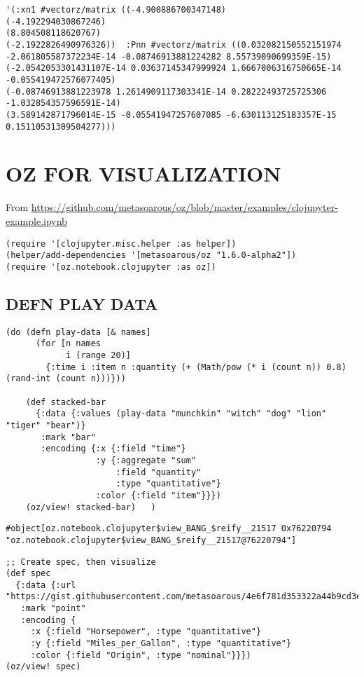 \documentclass[10pt,oneside,x11names]{article}
\begin{document}
\begin{verbatim}
'(:xn1 #vectorz/matrix ((-4.900886700347148)
(-4.192294030867246)
(8.804508118620767)
(-2.1922826490976326))  :Pnn #vectorz/matrix ((0.032082150552151974 -2.061805587372234E-14 -0.08746913881224282 8.55739090699359E-15)
(-2.0542053301431107E-14 0.03637145347999924 1.6667006316750665E-14 -0.055419472576077405)
(-0.08746913881223978 1.2614909117303341E-14 0.28222493725725306 -1.032854357596591E-14)
(3.589142871796014E-15 -0.05541947257607085 -6.630113125183357E-15 0.15110531309504277)))
\end{verbatim}

\section{OZ FOR VISUALIZATION}
\label{oz-for-visualization}
From
\url{https://github.com/metasoarous/oz/blob/master/examples/clojupyter-example.ipynb}

\begin{verbatim}
(require '[clojupyter.misc.helper :as helper])
(helper/add-dependencies '[metasoarous/oz "1.6.0-alpha2"])
(require '[oz.notebook.clojupyter :as oz])
\end{verbatim}

\subsection{DEFN PLAY DATA}
\label{sec:orgd712cee}

\begin{verbatim}
(do (defn play-data [& names]
      (for [n names
            i (range 20)]
        {:time i :item n :quantity (+ (Math/pow (* i (count n)) 0.8) (rand-int (count n)))}))

    (def stacked-bar
      {:data {:values (play-data "munchkin" "witch" "dog" "lion" "tiger" "bear")}
       :mark "bar"
       :encoding {:x {:field "time"}
                  :y {:aggregate "sum"
                      :field "quantity"
                      :type "quantitative"}
                  :color {:field "item"}}})
    (oz/view! stacked-bar)   )
\end{verbatim}

\begin{verbatim}
#object[oz.notebook.clojupyter$view_BANG_$reify__21517 0x76220794 "oz.notebook.clojupyter$view_BANG_$reify__21517@76220794"]
\end{verbatim}


\begin{verbatim}
;; Create spec, then visualize
(def spec
  {:data {:url "https://gist.githubusercontent.com/metasoarous/4e6f781d353322a44b9cd3e4597c532c/raw/cd633d9bb8e0bed4a5b8e66a32b9569ca2147989/cars.json"}
   :mark "point"
   :encoding {
     :x {:field "Horsepower", :type "quantitative"}
     :y {:field "Miles_per_Gallon", :type "quantitative"}
     :color {:field "Origin", :type "nominal"}}})
(oz/view! spec)
\end{verbatim}
\end{document}
